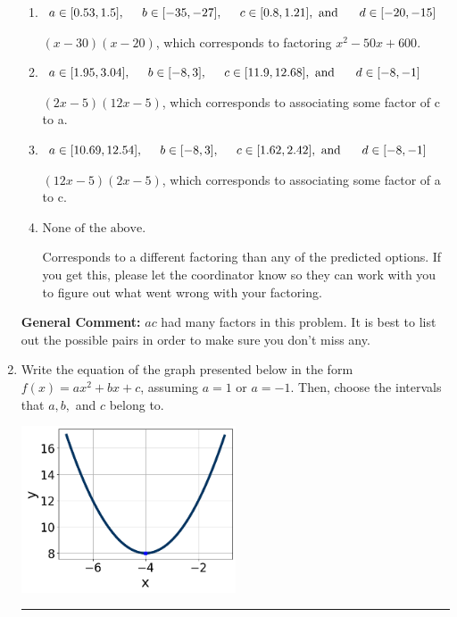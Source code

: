 \documentclass{extbook}[14pt]
\newcommand{\litem}[1]{\item #1

\rule{\textwidth}{0.4pt}}
\begin{document}
\begin{enumerate}
{\begin{enumerate}[label=\Alph*.]
* $(6x -5)(4x -5)$, which is the correct option.
\item \( a \in [0.53, 1.5], \hspace*{5mm} b \in [-35, -27], \hspace*{5mm} c \in [0.8, 1.21], \text{ and } \hspace*{5mm} d \in [-20, -15] \)

 $(x -30)(x -20)$, which corresponds to factoring $x^{2} -50 x + 600$.
\item \( a \in [1.95, 3.04], \hspace*{5mm} b \in [-8, 3], \hspace*{5mm} c \in [11.9, 12.68], \text{ and } \hspace*{5mm} d \in [-8, -1] \)

 $(2x -5)(12x -5)$, which corresponds to associating some factor of c to a.
\item \( a \in [10.69, 12.54], \hspace*{5mm} b \in [-8, 3], \hspace*{5mm} c \in [1.62, 2.42], \text{ and } \hspace*{5mm} d \in [-8, -1] \)

 $(12x -5)(2x -5)$, which corresponds to associating some factor of a to c.
\item \( \text{None of the above.} \)

 Corresponds to a different factoring than any of the predicted options. If you get this, please let the coordinator know so they can work with you to figure out what went wrong with your factoring.
\end{enumerate}

\textbf{General Comment:} $ac$ had many factors in this problem. It is best to list out the possible pairs in order to make sure you don't miss any.
}
\litem{
Write the equation of the graph presented below in the form $f(x)=ax^2+bx+c$, assuming  $a=1$ or $a=-1$. Then, choose the intervals that $a, b,$ and $c$ belong to.

\begin{center}
    \includegraphics[width=0.5\textwidth]{../Figures/quadraticGraphToEquationCopyC.png}
\end{center}


}
\end{enumerate}
\end{document}
